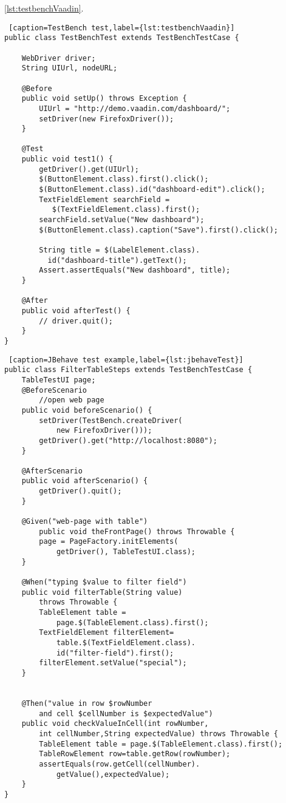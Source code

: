 	
	\ref{lst:testbenchVaadin}.
	\lstset{style=a1listing}
  	\begin{lstlisting} [caption=TestBench test,label={lst:testbenchVaadin}]
public class TestBenchTest extends TestBenchTestCase {

    WebDriver driver;
    String UIUrl, nodeURL;

    @Before
    public void setUp() throws Exception {
        UIUrl = "http://demo.vaadin.com/dashboard/";
        setDriver(new FirefoxDriver());
    }

    @Test
    public void test1() {
        getDriver().get(UIUrl);
        $(ButtonElement.class).first().click();
        $(ButtonElement.class).id("dashboard-edit").click();
        TextFieldElement searchField =
           $(TextFieldElement.class).first();
        searchField.setValue("New dashboard");
        $(ButtonElement.class).caption("Save").first().click();

        String title = $(LabelElement.class).
          id("dashboard-title").getText();
        Assert.assertEquals("New dashboard", title);
    }

    @After
    public void afterTest() {
        // driver.quit();
    }
}  	
\end{lstlisting}

 \lstset{style=a1listing}
\begin{lstlisting} [caption=JBehave test example,label={lst:jbehaveTest}]
public class FilterTableSteps extends TestBenchTestCase {
	TableTestUI page;
	@BeforeScenario
		//open web page
	public void beforeScenario() {
		setDriver(TestBench.createDriver(
			new FirefoxDriver()));
		getDriver().get("http://localhost:8080");
	}
	
	@AfterScenario
	public void afterScenario() {
		getDriver().quit();
	}
	
	@Given("web-page with table")
		public void theFrontPage() throws Throwable {
		page = PageFactory.initElements(
			getDriver(), TableTestUI.class);
	}
	
	@When("typing $value to filter field")
	public void filterTable(String value)
		throws Throwable {
		TableElement table =
			page.$(TableElement.class).first();
		TextFieldElement filterElement=
			table.$(TextFieldElement.class).
			id("filter-field").first();
		filterElement.setValue("special");
	}
	
	
	@Then("value in row $rowNumber 
		and cell $cellNumber is $expectedValue")
	public void checkValueInCell(int rowNumber,
		int cellNumber,String expectedValue) throws Throwable {
		TableElement table = page.$(TableElement.class).first();
		TableRowElement row=table.getRow(rowNumber);
		assertEquals(row.getCell(cellNumber).
			getValue(),expectedValue);
	}
}
\end{lstlisting}

